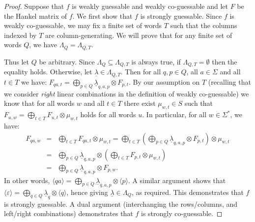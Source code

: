 \documentclass[10pt,a4paper]{amsart}
\theoremstyle{definition}
\numberwithin{equation}{section}
\numberwithin{theorem}{section}
\begin{document}
\begin{proof}
	Suppose that $f$ is weakly guessable and weakly co-guessable and let $F$ be the Hankel matrix of $f$. We first show that $f$ is strongly guessable. Since $f$ is weakly co-guessable, we may fix a  finite set of words $T$ such that the columns indexed by $T$ are column-generating. We will prove that for any finite set of words $Q$, we have $\Lambda_{Q} = \Lambda_{Q,T}$.
	
	Thus let $Q$ be arbitrary. Since $\Lambda_{Q} \subseteq \Lambda_{Q,T}$ is always true, if $\Lambda_{Q,T} = \emptyset$ then the equality holds. Otherwise, let $\underline{\lambda} \in \Lambda_{Q, T}$. Then for all $q, p \in Q$, all $a \in \Sigma$ and all $t \in T$ we have:
	$F_{qa,t} = \bigoplus_{p \in Q} \underline{\lambda}_{q,a,p} \otimes F_{p,t}$. By our assumption on $T$ (recalling that we consider \emph{right} linear combinations in the definition of weakly co-guessable) we know that for all words $w$ and all $t \in T$ there exist $\mu_{w,t} \in S$ such that $F_{u, w} = \bigoplus_{t \in T} F_{u, t} \otimes \mu_{w,t}$ holds for all words $u$. In particular, for all $w \in \Sigma^*$, we have:
	\begin{eqnarray*}
		F_{qa, w} &=& \bigoplus_{t \in T} F_{qa, t} \otimes \mu_{w,t} = \bigoplus_{t \in T} (\bigoplus_{p \in Q} \underline{\lambda}_{q,a,p} \otimes F_{p, t}) \otimes \mu_{w,t} \\
		&=& \bigoplus_{p \in Q} \underline{\lambda}_{q,a,p} \otimes (\bigoplus_{t \in T}  F_{p, t}\otimes \mu_{w,t})\\
		&=& \bigoplus_{p \in Q}\underline{\lambda}_{q,a,p} \otimes F_{p, w}.
	\end{eqnarray*}
	In other words, $\langle qa \rangle = \bigoplus_{p \in Q}\underline{\lambda}_{q,a,p} \otimes \langle p \rangle$. A similar argument shows that $\langle \varepsilon \rangle = \bigoplus_{q \in Q}\underline{\lambda}_{q} \otimes \langle q \rangle$, hence giving $\underline{\lambda} \in \Lambda_Q$, as required. This demonstrates that $f$ is strongly guessable. A dual argument (interchanging the rows/columns, and left/right combinations) demonstrates that $f$ is strongly co-guessable.
\end{proof}
\end{document}

